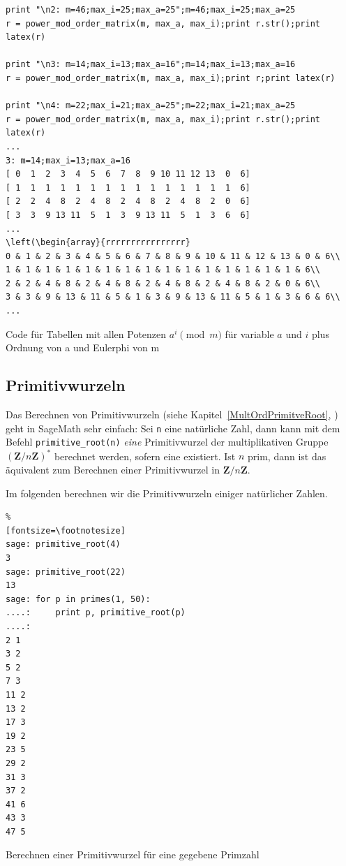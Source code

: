 \begin{refsegment}
\begin{sagecode}
\begin{Verbatim}
print "\n2: m=46;max_i=25;max_a=25";m=46;max_i=25;max_a=25
r = power_mod_order_matrix(m, max_a, max_i);print r.str();print latex(r)

print "\n3: m=14;max_i=13;max_a=16";m=14;max_i=13;max_a=16
r = power_mod_order_matrix(m, max_a, max_i);print r;print latex(r)

print "\n4: m=22;max_i=21;max_a=25";m=22;max_i=21;max_a=25
r = power_mod_order_matrix(m, max_a, max_i);print r.str();print latex(r)
...
3: m=14;max_i=13;max_a=16
[ 0  1  2  3  4  5  6  7  8  9 10 11 12 13  0  6]
[ 1  1  1  1  1  1  1  1  1  1  1  1  1  1  1  6]
[ 2  2  4  8  2  4  8  2  4  8  2  4  8  2  0  6]
[ 3  3  9 13 11  5  1  3  9 13 11  5  1  3  6  6]
...
\left(\begin{array}{rrrrrrrrrrrrrrrr}
0 & 1 & 2 & 3 & 4 & 5 & 6 & 7 & 8 & 9 & 10 & 11 & 12 & 13 & 0 & 6\\
1 & 1 & 1 & 1 & 1 & 1 & 1 & 1 & 1 & 1 & 1 & 1 & 1 & 1 & 1 & 6\\
2 & 2 & 4 & 8 & 2 & 4 & 8 & 2 & 4 & 8 & 2 & 4 & 8 & 2 & 0 & 6\\
3 & 3 & 9 & 13 & 11 & 5 & 1 & 3 & 9 & 13 & 11 & 5 & 1 & 3 & 6 & 6\\
...
\end{Verbatim}
\caption{Code für Tabellen mit allen Potenzen $a^i \pmod{m}$ für variable $a$ und $i$ plus Ordnung von a und Eulerphi von m}
\end{sagecode}




\newpage
\hypertarget{nt:AppArith3a2}{}
\subsection{Primitivwurzeln}
\label{nt:AppArith3a2}
\label{primitive-roots-with-sage}

Das Berechnen von Primitivwurzeln
(siehe Kapitel~\ref{MultOrdPrimitveRoot}, \glqq {}\grqq)
geht in SageMath sehr einfach: Sei \verb!n! eine natürliche Zahl, dann kann mit dem Befehl
\verb!primitive_root(n)! \textit{eine} Primitivwurzel der multiplikativen Gruppe
$(\mathbf{Z} / n \mathbf{Z})^{\ast}$ berechnet werden, sofern eine existiert.
Ist $n$ prim, dann ist das äquivalent zum Berechnen einer Primitivwurzel in
$\mathbf{Z} / n \mathbf{Z}$.

 Im folgenden berechnen wir die Primitivwurzeln einiger natürlicher Zahlen.

\begin{sagecode}
\begin{Verbatim}%
[fontsize=\footnotesize]
sage: primitive_root(4)
3
sage: primitive_root(22)
13
sage: for p in primes(1, 50):
....:     print p, primitive_root(p)
....:
2 1
3 2
5 2
7 3
11 2
13 2
17 3
19 2
23 5
29 2
31 3
37 2
41 6
43 3
47 5
\end{Verbatim}
\caption{Berechnen einer Primitivwurzel für eine gegebene Primzahl}
\end{sagecode}


\end{refsegment}
